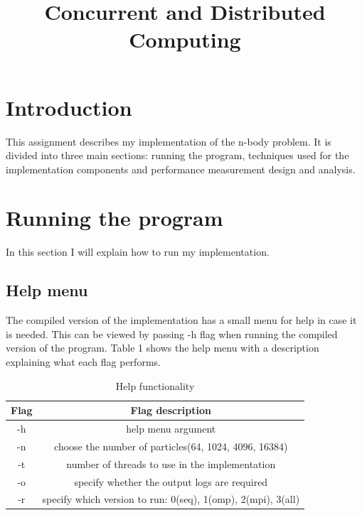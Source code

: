 \documentclass[12pt]{IEEEtran}
\begin{document}
\title{Concurrent and Distributed Computing}

\author{
}

\maketitle
\IEEEpeerreviewmaketitle


\section{Introduction}
This assignment describes my implementation of the n-body problem. It is divided into three main sections: running the program, techniques used for the implementation components and performance measurement design and analysis.

\section{Running the program}
In this section I will explain how to run my implementation. 

\subsection{Help menu}
The compiled version of the implementation has a small menu for help in case it is needed. This can be viewed by passing -h flag when running the compiled version of the program. Table 1 shows the help menu with a description explaining what each flag performs.

\begin{table}[ht]
\caption{Help functionality}
\centering 
\begin{tabular}{c c}
\hline
Flag & Flag description\\[0.5ex]
\hline
-h & help menu argument\\
-n & choose the number of particles(64, 1024, 4096, 16384) \\
-t & number of threads to use in the implementation\\
-o & specify whether the output logs are required\\
-r & specify which version to run: 0(seq), 1(omp), 2(mpi), 3(all)\\
[1ex]
\hline
\end{tabular}
\label{table:nonlin}
\end{table}
\end{document}
